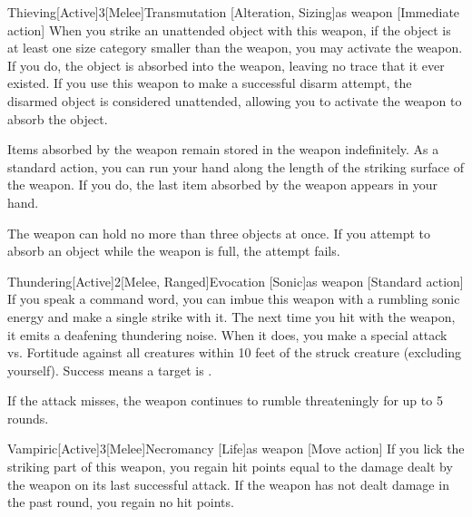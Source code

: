             \begin{magicitemdef}{Thieving}[Active]{3}[Melee]{Transmutation [Alteration, Sizing]}{as weapon}
                [Immediate action] When you strike an unattended object with this weapon, if the object is at least one size category smaller than the weapon, you may activate the weapon.
                If you do, the object is absorbed into the weapon, leaving no trace that it ever existed.
                If you use this weapon to make a successful disarm attempt, the disarmed object is considered unattended, allowing you to activate the weapon to absorb the object.

                 Items absorbed by the weapon remain stored in the weapon indefinitely.
                As a standard action, you can run your hand along the length of the striking surface of the weapon.
                If you do, the last item absorbed by the weapon appears in your hand.

                The weapon can hold no more than three objects at once.
                If you attempt to absorb an object while the weapon is full, the attempt fails.
            \end{magicitemdef}

            \begin{magicitemdef}{Thundering}[Active]{2}[Melee, Ranged]{Evocation [Sonic]}{as weapon}
                [Standard action] If you speak a command word, you can imbue this weapon with a rumbling sonic energy and make a single strike with it.
                The next time you hit with the weapon, it emits a deafening thundering noise.
                When it does, you make a special attack vs. Fortitude against all creatures within 10 feet of the struck creature (excluding yourself).
                Success means a target is \deafened.

                If the attack misses, the weapon continues to rumble threateningly for up to 5 rounds.
            \end{magicitemdef}

            \begin{magicitemdef}{Vampiric}[Active]{3}[Melee]{Necromancy [Life]}{as weapon}
                [Move action] If you lick the striking part of this weapon, you regain hit points equal to the damage dealt by the weapon on its last successful attack.
                If the weapon has not dealt damage in the past round, you regain no hit points.
            \end{magicitemdef}

